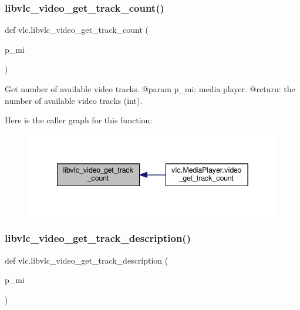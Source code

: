 \subsubsection{\texorpdfstring{libvlc\+\_\+video\+\_\+get\+\_\+track\+\_\+count()}{libvlc\_video\_get\_track\_count()}}
{\footnotesize\ttfamily def vlc.\+libvlc\+\_\+video\+\_\+get\+\_\+track\+\_\+count (\begin{DoxyParamCaption}\item[{}]{p\+\_\+mi }\end{DoxyParamCaption})}

\begin{DoxyVerb}Get number of available video tracks.
@param p_mi: media player.
@return: the number of available video tracks (int).
\end{DoxyVerb}
 Here is the caller graph for this function\+:
\nopagebreak
\begin{figure}[H]
\begin{center}
\leavevmode
\includegraphics[width=342pt]{namespacevlc_a87f53e3e2f2f5b5a0c24aaa72e6575b0_icgraph}
\end{center}
\end{figure}
\mbox{\label{namespacevlc_a68edc909fdc25c8f1fc60031778445af}} 
\subsubsection{\texorpdfstring{libvlc\+\_\+video\+\_\+get\+\_\+track\+\_\+description()}{libvlc\_video\_get\_track\_description()}}
{\footnotesize\ttfamily def vlc.\+libvlc\+\_\+video\+\_\+get\+\_\+track\+\_\+description (\begin{DoxyParamCaption}\item[{}]{p\+\_\+mi }\end{DoxyParamCaption})}


